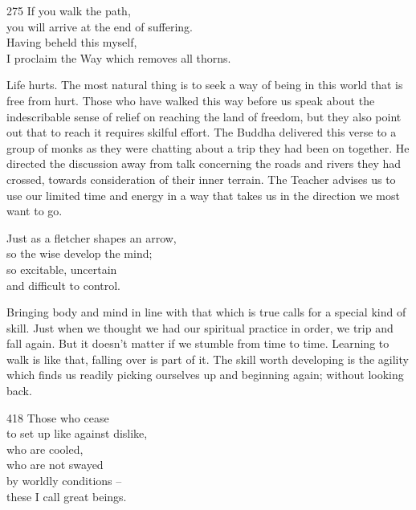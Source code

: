 
\begin{dhpVerse}{275}
\label{dhp-275}
If you walk the path,\\
you will arrive at the end of suffering.\\
Having beheld this myself,\\
I proclaim the Way which removes all thorns.
\end{dhpVerse}

\begin{dhpRefl}
  Life hurts. The most natural thing is to seek a way of being in this world
  that is free from hurt. Those who have walked this way before us speak about
  the indescribable sense of relief on reaching the land of freedom, but they
  also point out that to reach it requires skilful effort. The Buddha delivered
  this verse to a group of monks as they were chatting about a trip they had
  been on together. He directed the discussion away from talk concerning the
  roads and rivers they had crossed, towards consideration of their inner
  terrain. The Teacher advises us to use our limited time and energy in a way
  that takes us in the direction we most want to go.
\end{dhpRefl}


\begin{dhpVerse}{33}
\label{dhp-33}
Just as a fletcher shapes an arrow,\\
so the wise develop the mind;\\
so excitable, uncertain\\
and difficult to control.
\end{dhpVerse}

\begin{dhpRefl}
  Bringing body and mind in line with that which is true calls for a special
  kind of skill. Just when we thought we had our spiritual practice in order, we
  trip and fall again. But it doesn’t matter if we stumble from time to time.
  Learning to walk is like that, falling over is part of it. The skill worth
  developing is the agility which finds us readily picking ourselves up and
  beginning again; without looking back.
\end{dhpRefl}


\begin{dhpVerse}{418}
\label{dhp-418}
Those who cease\\
to set up like against dislike,\\
who are cooled,\\
who are not swayed\\
by worldly conditions --\\
these I call great beings.
\end{dhpVerse}

